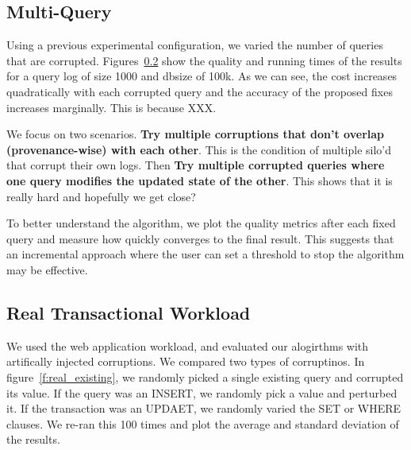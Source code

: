 {  \subsection{Multi-Query}

  Using a previous experimental configuration, we varied the number of queries that are corrupted.  Figures~\ref{}
  show the quality and running times of the results for a query log of size 1000 and dbsize of 100k.  
  As we can see, the cost increases quadratically with each corrupted query and the accuracy of the proposed fixes increases marginally.  
  This is because XXX.

  We focus on two scenarios.  {\bf Try multiple corruptions that don't overlap (provenance-wise) with each other}.  This is the condition of multiple silo'd that
  corrupt their own logs.  Then {\bf Try multiple corrupted queries where one query modifies the updated state of the other}.  This shows that
  it is really hard and hopefully we get close?



  To better understand the algorithm, we plot the quality metrics after each fixed query and measure how quickly \sys converges to the final result. 
  This suggests that an incremental approach where the user can set a threshold to stop the algorithm may be effective.



  \subsection{Real Transactional Workload}

  We used the web application workload, and evaluated our alogirthms with artifically injected corruptions.
  We compared two types of corruptinos.  In figure~\ref{f:real_existing}, we randomly picked a single existing 
  query and corrupted its value.  If the query was an INSERT, we randomly pick a value and perturbed it.
  If the transaction was an UPDAET, we randomly varied the SET or WHERE clauses.   We re-ran this
  100 times and plot the average and standard deviation of the results.

}

